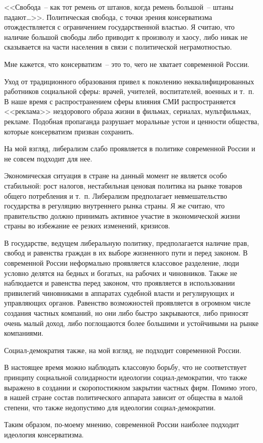 \documentclass[pscyr,notitlepage]{hedwork}
\begin{document}
  <<Свобода~-- как тот ремень от штанов, когда ремень большой~-- штаны
  падают\ldots>>. Политическая свобода, с точки зрения консерватизма
  отождествляется с ограничением государственной властью. Я считаю, что наличие
  большой свободы либо приводит к произволу и хаосу, либо никак не сказывается
  на части населения в связи с политической неграмотностью.

  Мне кажется, что консерватизм~-- это то, чего не хватает современной России.

  Уход от традиционного образования привел к поколению неквалифицированных
  работников социальной сферы: врачей, учителей, воспитателей, военных и т.~п.
  В наше время с распространением сферы влияния СМИ распространяется <<реклама>>
  нездорового образа жизни в фильмах, сериалах, мультфильмах, рекламе.
  Подобная пропаганда разрушает моральные устои и ценности общества, которые
  консерватизм призван сохранить.

  На мой взгляд, либерализм слабо проявляется в политике современной России и
  не совсем подходит для нее.

  Экономическая ситуация в стране на данный момент не является особо
  стабильной: рост налогов, нестабильная ценовая политика на рынке товаров
  общего потребления и т.~п. Либерализм предполагает невмешательство государства
  в регуляцию внутреннего рынка страны. Я же считаю, что правительство должно
  принимать активное участие в экономической жизни страны во избежание ее резких
  изменений, кризисов.

  В государстве, ведущем либеральную политику, предполагается наличие прав,
  свобод и равенства граждан в их выборе жизненного пути и перед законом. В
  современной России неформально проявляется классовое разделение, люди условно
  делятся на бедных и богатых, на рабочих и чиновников. Также не наблюдается и
  равенства перед законом, что проявляется в использовании привилегий
  чиновниками в аппаратах судебной власти и регулирующих и управляющих органов.
  Равенство возможностей проявляется в огромном числе создания частных компаний,
  но они либо быстро закрываются, либо приносят очень малый доход, либо
  поглощаются более большими и устойчивыми на рынке компаниями.

  Социал-демократия также, на мой взгляд, не подходит современной России.

  В настоящее время можно наблюдать классовую борьбу, что не соответствует
  принципу социальной солидарности идеологии социал-демократии, что также
  выражено в создании и скоропостижном закрытии частных фирм. Помимо этого,
  в нашей стране состав политического аппарата зависит от общества в малой
  степени, что также недопустимо для идеологии социал-демократии.

  Таким образом, по-моему мнению, современной России наиболее подходит идеология
  консерватизма.
\end{document}
